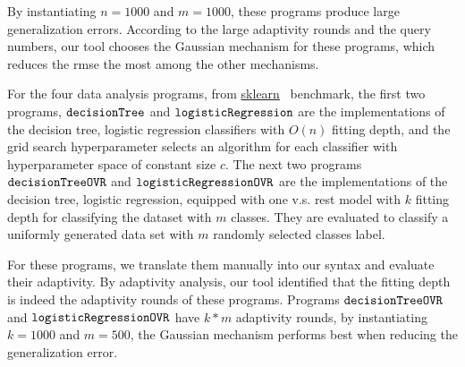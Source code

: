 
By instantiating $n = 1000$ and $m = 1000$, these programs produce large generalization errors.
According to the large adaptivity rounds and the query numbers, our tool chooses the Gaussian mechanism for these programs, which reduces the rmse the most
among the other mechanisms.


For the four data analysis programs, 
from \hyperlink{https://github.com/scikit-learn/scikit-learn/tree/main/examples}{sklearn}~\cite{SklearnBenchmark} benchmark,
the first two programs, $\mathtt{decisionTree}$ and $\mathtt{logisticRegression}$ are
the
implementations of the decision tree, logistic regression classifiers
with $O(n)$ fitting depth,
and the grid search hyperparameter selects an algorithm for each classifier with 
hyperparameter space of constant size $c$.
The next two programs $\mathtt{decisionTreeOVR}$ and $\mathtt{logisticRegressionOVR}$ are
the implementations of the decision tree, logistic regression, equipped with one v.s. rest model with $k$ fitting depth for classifying the dataset with $m$ classes.
They are evaluated to classify a uniformly generated data set with $m$ randomly selected classes label.

For these programs, we translate them manually into our syntax and evaluate their adaptivity.
By adaptivity analysis, our tool identified that the fitting depth is indeed the adaptivity rounds of these programs.
Programs $\mathtt{decisionTreeOVR}$ and $\mathtt{logisticRegressionOVR}$ 
have $k*m$ adaptivity rounds, by instantiating $k = 1000$ and $m = 500$,
the Gaussian mechanism performs best when reducing the generalization error.









